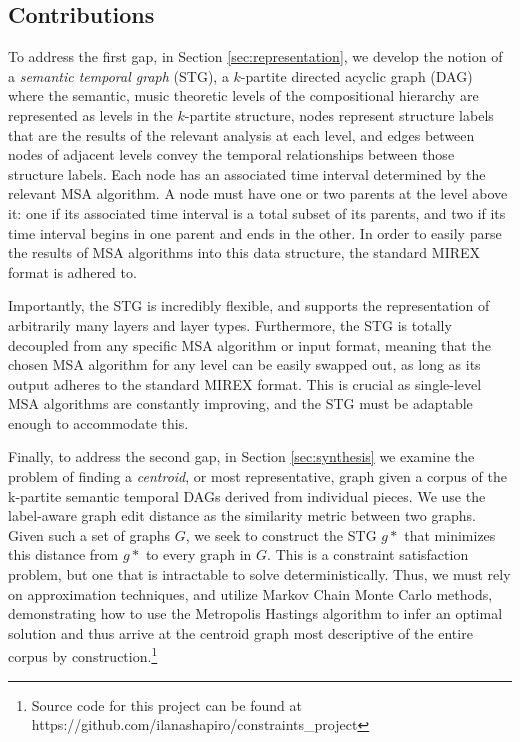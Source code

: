 \documentclass{article}
\begin{document}
\subsection{Contributions}\label{subsec:contributions}

To address the first gap, in Section \ref{sec:representation}, we develop the notion of a \textit{semantic temporal graph} (STG), a $k$-partite directed acyclic graph (DAG) where the semantic, music theoretic levels of the compositional hierarchy are represented as levels in the $k$-partite structure, nodes represent structure labels that are the results of the relevant analysis at each level, and edges between nodes of adjacent levels convey the temporal relationships between those structure labels. Each node has an associated time interval determined by the relevant MSA algorithm. A node must have one or two parents at the level above it: one if its associated time interval is a total subset of its parents, and two if its time interval begins in one parent and ends in the other. In order to easily parse the results of MSA algorithms into this data structure, the standard MIREX format is adhered to.

Importantly, the STG is incredibly flexible, and supports the representation of arbitrarily many layers and layer types. Furthermore, the STG is totally decoupled from any specific MSA algorithm or input format, meaning that the chosen MSA algorithm for any level can be easily swapped out, as long as its output adheres to the standard MIREX format. This is crucial as single-level MSA algorithms are constantly improving, and the STG must be adaptable enough to accommodate this.

Finally, to address the second gap, in Section \ref{sec:synthesis} we examine the problem of finding a \textit{centroid}, or most representative, graph given a corpus of the k-partite semantic temporal DAGs derived from individual pieces. We use the label-aware graph edit distance as the similarity metric between two graphs. Given such a set of graphs $G$, we seek to construct the STG $g*$ that minimizes this distance from $g*$ to every graph in $G$. This is a constraint satisfaction problem, but one that is intractable to solve deterministically. Thus, we must rely on approximation techniques, and utilize Markov Chain Monte Carlo methods, demonstrating how to use the Metropolis Hastings algorithm to infer an optimal solution and thus arrive at the centroid graph most descriptive of the entire corpus by construction.\footnote{Source code for this project can be found at https://github.com/ilanashapiro/constraints\_project}
\end{document}
